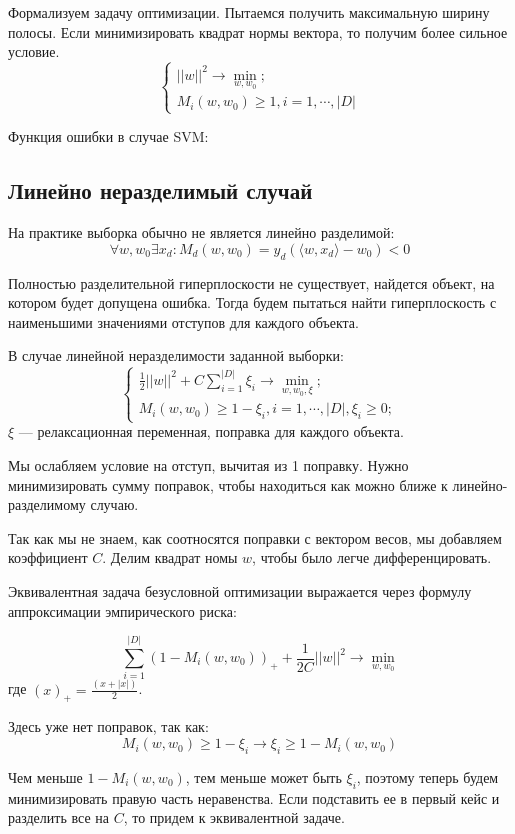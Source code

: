 Формализуем задачу оптимизации. Пытаемся получить максимальную ширину полосы.
Если минимизировать квадрат нормы вектора, то получим более сильное
условие.
\[
    \begin{cases}
        ||w||^2 \to \min_{w, w_0};
       \\
       M_i(w, w_0) \geq 1, i = 1, \cdots, |D|
    \end{cases}
\]

Функция ошибки в случае SVM:


\subsection{Линейно неразделимый случай}

На практике выборка обычно не является линейно разделимой:
\[
    \forall w, w_0 \exists x_d : M_d(w, w_0) = y_d(\langle w, x_d \rangle -
    w_0) < 0
\]

Полностью разделительной гиперплоскости не существует, найдется объект, на котором будет
допущена ошибка. Тогда будем пытаться найти гиперплоскость с наименьшими
значениями отступов для каждого объекта.

В случае линейной неразделимости заданной выборки:
\[
    \begin{cases}
        \frac{1}{2} ||w||^2 + C \sum^{|D|}_{i=1} \xi_i \to \min_{w, w_0, \xi};
        \\
        M_i(w, w_0) \geq 1 - \xi_i, i = 1, \cdots, |D|, \xi_i \geq 0;
    \end{cases}
\]
$\xi$ --- релаксационная переменная, поправка для каждого объекта.

Мы ослабляем условие на отступ, вычитая из 1 поправку. Нужно минимизировать
сумму поправок, чтобы находиться как можно ближе к линейно-разделимому
случаю.

Так как мы не знаем, как соотносятся поправки с вектором весов, мы добавляем
коэффициент $C$. Делим квадрат номы $w$, чтобы было легче дифференцировать.

Эквивалентная задача безусловной оптимизации выражается через формулу
аппроксимации эмпирического риска:

\[
    \sum^{|D|}_{i=1}(1 - M_i(w, w_0))_+ + \frac{1}{2C}||w||^2 \to \min_{w, w_0}
\]
где $(x)_+ = \frac{(x + |x|)}{2}$.

Здесь уже нет поправок, так как:
\[
    M_i(w, w_0) \geq 1 - \xi_i \to \xi_i \geq 1 - M_i(w, w_0)
\]

Чем меньше $1 - M_i(w, w_0)$, тем меньше может быть $\xi_i$, поэтому теперь
будем минимизировать правую часть неравенства. Если подставить ее в первый кейс
и разделить все на $C$, то придем к эквивалентной задаче.

